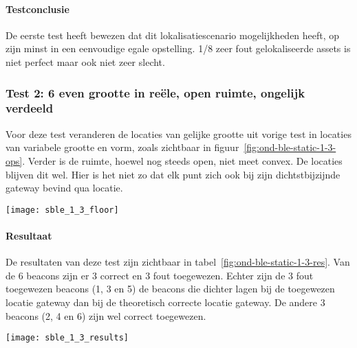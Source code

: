 \paragraph{Testconclusie}
De eerste test heeft bewezen dat dit lokalisatiescenario mogelijkheden heeft, op zijn minst in een eenvoudige egale opstelling. 1/8 zeer fout gelokaliseerde assets is niet perfect maar ook niet zeer slecht.

\subsubsection{Test 2: 6 even grootte in reële, open ruimte, ongelijk verdeeld}
\label{sec:ond-ble-1-2}
\begin{minipage}{0.55\textwidth}
Voor deze test veranderen de locaties van gelijke grootte uit vorige test in locaties van variabele grootte en vorm, zoals zichtbaar in figuur~\ref{fig:ond-ble-static-1-3-ops}. Verder is de ruimte, hoewel nog steeds open, niet meet convex. De locaties blijven dit wel. Hier is het niet zo dat elk punt zich ook bij zijn dichtstbijzijnde gateway bevind qua locatie. 
\end{minipage}
\hfill
\begin{minipage}{0.42\textwidth}
	\texttt{[image: sble\_1\_3\_floor]}
	\label{fig:ond-ble-static-1-3-ops}
\end{minipage}

\paragraph{Resultaat}
\begin{minipage}{0.55\textwidth}
De resultaten van deze test zijn zichtbaar in tabel~\ref{fig:ond-ble-static-1-3-res}. Van de 6 beacons zijn er 3 correct en 3 fout toegewezen. Echter zijn de 3 fout toegewezen beacons (1, 3 en 5) de beacons die dichter lagen bij de toegewezen locatie gateway dan bij de theoretisch correcte locatie gateway. De andere 3 beacons (2, 4 en 6) zijn wel correct toegewezen. 
\end{minipage}
\hfill
\begin{minipage}{0.42\textwidth}
	\texttt{[image: sble\_1\_3\_results]}
	\label{fig:ond-ble-static-1-3-res}
\end{minipage}

